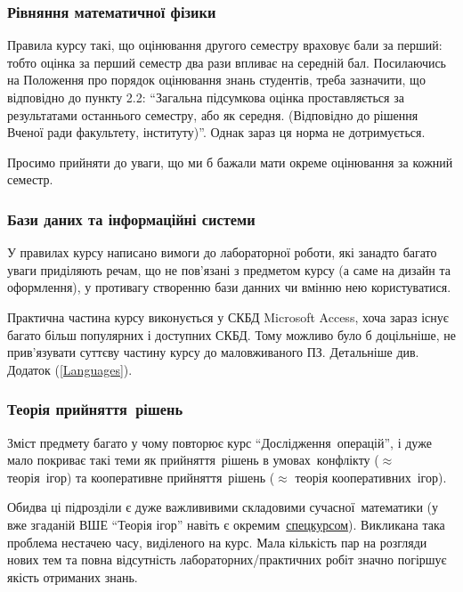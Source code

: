 \documentclass[14pt, a4paper]{extarticle}  %
\begin{document}
\subsubsection{Рівняння математичної фізики}

Правила курсу такі, що оцінювання другого семестру враховує бали за перший: тобто оцінка за перший семестр два рази впливає на середній бал. Посилаючись на Положення про порядок оцінювання знань студентів, треба зазначити, що відповідно до пункту 2.2: ``Загальна підсумкова оцінка проставляється за результатами останнього семестру, або як середня. (Відповідно до рішення Вченої ради факультету, інституту)''. Однак зараз ця норма не дотримується. 

Просимо прийняти до уваги, що ми б бажали мати окреме оцінювання за кожний семестр. 

\subsubsection{Бази даних та інформаційні системи}
У правилах курсу написано вимоги до лабораторної роботи, які занадто багато уваги приділяють речам, що не пов'язані з предметом курсу (а саме на дизайн  та оформлення), у противагу створенню бази данних чи вмінню нею користуватися. 

Практична частина курсу виконується у СКБД Microsoft Access, хоча зараз існує багато більш популярних і доступних СКБД. Тому можливо було б доцільніше, не прив'язувати суттєву частину курсу до маловживаного ПЗ. Детальніше див. Додаток (\ref{Languages}).

\subsubsection{Теорія прийняття~рішень}
Зміст предмету багато у чому повторює курс ``Дослідження~операцій'', і дуже мало покриває такі теми як прийняття~рішень в умовах~конфлікту ($\approx$ теорія~ігор) та кооперативне прийняття~рішень ($\approx$ теорія кооперативних~ігор). 

Обидва ці підрозділи є  дуже важлививими складовими сучасної~математики (у вже згаданій ВШЕ ``Теорія ігор'' навіть є окремим~\href{https://www.coursera.org/learn/game-theory}{спецкурсом}). 
Викликана така проблема нестачею часу, виділеного на курс.
Мала кількість пар на розгляди нових тем та повна відсутність лабораторних/практичних робіт значно погіршує якість отриманих знань. 

\end{document}
